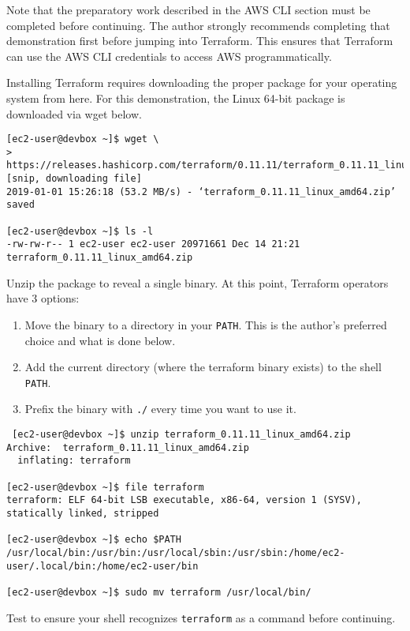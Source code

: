Note that the preparatory work described in the AWS CLI section must be
completed before continuing. The author strongly recommends completing that
demonstration first before jumping into Terraform. This ensures that Terraform
can use the AWS CLI credentials to access AWS programmatically.

Installing Terraform requires downloading the proper package for your
operating system from here. For this demonstration, the Linux 64-bit package
is downloaded via wget below.

\begin{verbatim}
[ec2-user@devbox ~]$ wget \
>  https://releases.hashicorp.com/terraform/0.11.11/terraform_0.11.11_linux_amd64.zip
[snip, downloading file]
2019-01-01 15:26:18 (53.2 MB/s) - ‘terraform_0.11.11_linux_amd64.zip’ saved

[ec2-user@devbox ~]$ ls -l
-rw-rw-r-- 1 ec2-user ec2-user 20971661 Dec 14 21:21 terraform_0.11.11_linux_amd64.zip
\end{verbatim}

Unzip the package to reveal a single binary. At this point, Terraform
operators have 3 options:

\begin{enumerate}
  \item	Move the binary to a directory in your \verb|PATH|. This is the
  author's preferred choice and what is done below.
  \item	Add the current directory (where the terraform binary exists) to the
  shell \verb|PATH|.
  \item	Prefix the binary with \verb|./| every time you want to use it.
\end{enumerate}

\begin{verbatim}
 [ec2-user@devbox ~]$ unzip terraform_0.11.11_linux_amd64.zip
Archive:  terraform_0.11.11_linux_amd64.zip
  inflating: terraform

[ec2-user@devbox ~]$ file terraform
terraform: ELF 64-bit LSB executable, x86-64, version 1 (SYSV), statically linked, stripped

[ec2-user@devbox ~]$ echo $PATH
/usr/local/bin:/usr/bin:/usr/local/sbin:/usr/sbin:/home/ec2-user/.local/bin:/home/ec2-user/bin

[ec2-user@devbox ~]$ sudo mv terraform /usr/local/bin/
\end{verbatim}

Test to ensure your shell recognizes \verb|terraform| as a command before continuing.


